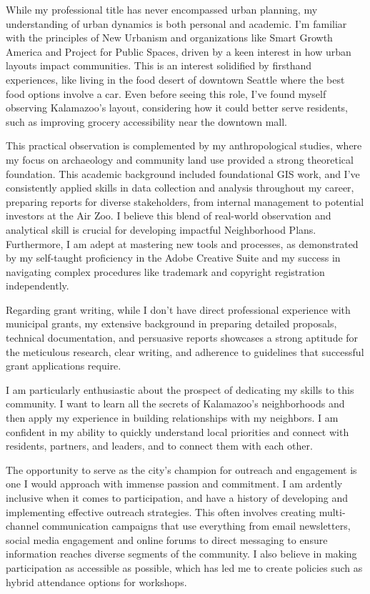 \documentclass[11pt]{letter} %
\begin{document}
\begin{letter}{}
	While my professional title has never encompassed urban planning, my understanding of urban dynamics is both personal and academic. I'm familiar with the principles of New Urbanism and organizations like Smart Growth America and Project for Public Spaces, driven by a keen interest in how urban layouts impact communities. This is an interest solidified by firsthand experiences, like living in the food desert of downtown Seattle where the best food options involve a car. Even before seeing this role, I've found myself observing Kalamazoo's layout, considering how it could better serve residents, such as improving grocery accessibility near the downtown mall.

	This practical observation is complemented by my anthropological studies, where my focus on archaeology and community land use provided a strong theoretical foundation. This academic background included foundational GIS work, and I've consistently applied skills in data collection and analysis throughout my career, preparing reports for diverse stakeholders, from internal management to potential investors at the Air Zoo. I believe this blend of real-world observation and analytical skill is crucial for developing impactful Neighborhood Plans. Furthermore, I am adept at mastering new tools and processes, as demonstrated by my self-taught proficiency in the Adobe Creative Suite and my success in navigating complex procedures like trademark and copyright registration independently.

	Regarding grant writing, while I don't have direct professional experience with municipal grants, my extensive background in preparing detailed proposals, technical documentation, and persuasive reports showcases a strong aptitude for the meticulous research, clear writing, and adherence to guidelines that successful grant applications require.

	I am particularly enthusiastic about the prospect of dedicating my skills to this community. I want to learn all the secrets of Kalamazoo's neighborhoods and then apply my experience in building relationships with my neighbors. I am confident in my ability to quickly understand local priorities and connect with residents, partners, and leaders, and to connect them with each other.

	The opportunity to serve as the city’s champion for outreach and engagement is one I would approach with immense passion and commitment. I am ardently inclusive when it comes to participation, and have a history of developing and implementing effective outreach strategies. This often involves creating multi-channel communication campaigns that use everything from email newsletters, social media engagement and online forums to direct messaging to ensure information reaches diverse segments of the community. I also believe in making participation as accessible as possible, which has led me to create policies such as hybrid attendance options for workshops.


\end{letter}
\end{document}
